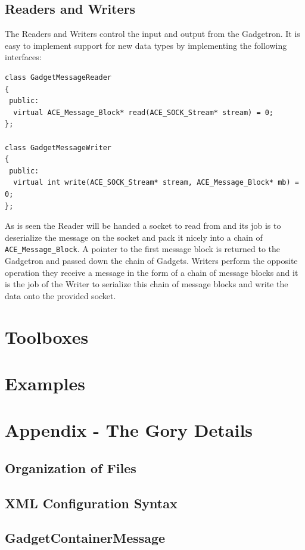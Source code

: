 \documentclass[11pt]{article}
\begin{document}
\subsection{Readers and Writers}
The Readers and Writers control the input and output from the Gadgetron. It is easy to implement support for new data types by implementing the following interfaces:
{\scriptsize 
\begin{verbatim}
class GadgetMessageReader
{
 public:
  virtual ACE_Message_Block* read(ACE_SOCK_Stream* stream) = 0;
};

class GadgetMessageWriter
{
 public:
  virtual int write(ACE_SOCK_Stream* stream, ACE_Message_Block* mb) = 0;
};
\end{verbatim}}
\noindent
As is seen the Reader will be handed a socket to read from and its job is to deserialize the message on the socket and pack it nicely into a chain of \texttt{ACE\_Message\_Block}. A pointer to the first message block is returned to the Gadgetron and passed down the chain of Gadgets. Writers perform the opposite operation they receive a message in the form of a chain of message blocks and it is the job of the Writer to serialize this chain of message blocks and write the data onto the provided socket.

\section{Toolboxes}


\section{Examples}

\renewcommand{\refname}{\section{References}}
{}


\section{Appendix - The Gory Details}
\subsection{Organization of Files}
\subsection{XML Configuration Syntax}
\subsection{GadgetContainerMessage}
\label{section:gadgetcontainermessage}
\end{document}
